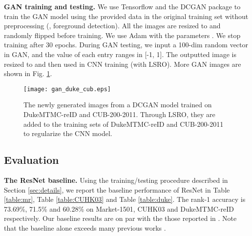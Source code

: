 \documentclass[10pt,twocolumn,letterpaper]{article}
\begin{document}
\textbf{GAN training and testing.} We use Tensorflow \cite{abadi2016tensorflow} and the DCGAN package \cite{DCGAN-tensorflow} to train the GAN model using the provided data in the original training set without preprocessing (\eg, foreground detection). All the images are resized to  and randomly flipped before training. We use Adam \cite{kingma2014adam} with the parameters . We stop training after 30 epochs. During GAN testing, we input a 100-dim random vector in GAN, and the value of each entry ranges in [-1, 1]. The outputted image is resized to  and then used in CNN training (with LSRO). More GAN images are shown in Fig. \ref{fig:gan}.



\begin{figure}
\begin{center}
\texttt{[image: gan\_duke\_cub.eps]}
\end{center}
   \caption{The newly generated images from a DCGAN model trained on DukeMTMC-reID and CUB-200-2011. Through LSRO, they are added to the training sets of DukeMTMC-reID and CUB-200-2011 to regularize the CNN model.}
\label{fig:gan}
\end{figure} 


\subsection{Evaluation} \label{sec:Evaluation}
\textbf{The ResNet baseline.} Using the training/testing procedure described in Section \ref{sec:details}, we report the baseline performance of ResNet in Table \ref{table:mr}, Table \ref{table:CUHK03} and Table \ref{table:duke}. The rank-1 accuracy is 73.69\%, 71.5\% and 60.28\% on Market-1501, CUHK03 and DukeMTMC-reID respectively. Our baseline results are on par with the those reported in \cite{zheng2016survey,zheng2016discriminatively}. Note that the baseline alone exceeds many previous works \cite{liao2015person,varior2016siamese,zhang2016learning}.
\end{document}
